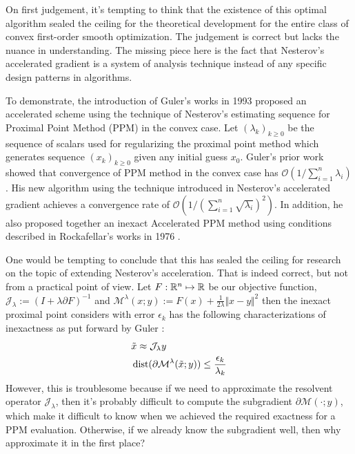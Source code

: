 \documentclass[12pt]{article}
\begin{document}
    On first judgement, it's tempting to think that the existence of this optimal algorithm sealed the ceiling for the theoretical development for the entire class of convex first-order smooth optimization. 
    The judgement is correct but lacks the nuance in understanding. 
    The missing piece here is the fact that Nesterov's accelerated gradient is a system of analysis technique instead of any specific design patterns in algorithms. 
    
    To demonstrate, the introduction of Guler's works in 1993 \cite{guler_new_1992} proposed an accelerated scheme using the technique of Nesterov's estimating sequence for Proximal Point Method (PPM) in the convex case. 
    Let $(\lambda_k)_{k \ge 0}$ be the sequence of scalars used for regularizing the proximal point method which generates sequence $(x_k)_{k\ge 0}$ given any initial guess $x_0$. 
    Guler's prior work \cite{guler_convergence_1991} showed that convergence of PPM method in the convex case has $\mathcal O\left(1/\sum^{n}_{i = 1}\lambda_i\right)$. 
    His new algorithm using the technique introduced in Nesterov's accelerated gradient achieves a convergence rate of $\mathcal O\left(1/(\sum_{i = 1}^{n} \sqrt{\lambda_i})^2\right)$. 
    In addition, he also proposed together an inexact Accelerated PPM method using conditions described in Rockafellar's works in 1976 \cite{rockafellar_monotone_1976}. 

    One would be tempting to conclude that this has sealed the ceiling for research on the topic of extending Nesterov's acceleration. 
    That is indeed correct, but not from a practical point of view. 
    Let $F: \mathbb R^n \mapsto \mathbb R$ be our objective function, $\mathcal J_\lambda := (I + \lambda \partial F)^{-1}$ and $\mathcal M^{\lambda}(x; y):= F(x) + \frac{1}{2\lambda}\Vert x - y\Vert^2$ then the inexact proximal point considers with error $\epsilon_k$ has the following characterizations of inexactness as put forward by Guler \cite{guler_new_1992}: 
    \begin{align*}
        & \tilde x \approx \mathcal J_\lambda y
        \\
        & 
        \operatorname{dist}(\partial\mathcal{M}^{\lambda}(\tilde x; y))
        \le \frac{\epsilon_k}{\lambda_k}
    \end{align*}
    However, this is troublesome because if we need to approximate the resolvent operator $\mathcal J_\lambda$, then it's probably difficult to compute the subgradient $\partial\mathcal M(\cdot; y)$, which make it difficult to know when we achieved the required exactness for a PPM evaluation. 
    Otherwise, if we already know the subgradient well, then why approximate it in the first place? 
\end{document}
